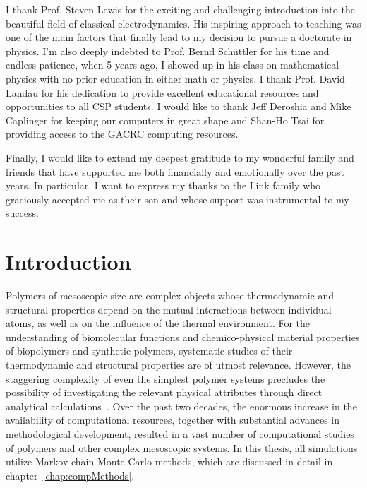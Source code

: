 \documentclass[12pt]{report}
\begin{document}
I thank Prof. Steven Lewis for the exciting and challenging introduction into the beautiful field of classical electrodynamics. His inspiring approach to teaching was one of the main factors that finally lead to my decision to pursue a doctorate in physics. I'm also deeply indebted to Prof. Bernd Sch\"{u}ttler for his time and endless patience, when 5 years ago, I showed up in his class on mathematical physics with no prior education in either math or physics. I thank Prof. David Landau for his dedication to provide excellent educational resources and opportunities to all CSP students. I would like to thank Jeff Deroshia and Mike Caplinger for keeping our computers in great shape and Shan-Ho Tsai for providing access to the GACRC computing resources.

Finally, I would like to extend my deepest gratitude to my wonderful family and friends that have supported me both financially and emotionally over the past years. In particular, I want to express my thanks to the Link family who graciously accepted me as their son and whose support was instrumental to my success.


\setcounter{tocdepth}{1}
\tableofcontents
{}
\listoffigures  %
\listoftables %


\chapter{Introduction}
\setcounter{page}{1}

%
Polymers of mesoscopic size are complex objects whose thermodynamic and structural properties depend on the mutual interactions between individual atoms, as well as on the influence of the thermal environment. For the understanding of biomolecular functions and chemico-physical material properties of biopolymers and synthetic polymers, systematic studies of their thermodynamic and structural properties are of utmost relevance. However, the staggering complexity of even the simplest polymer systems precludes the possibility of investigating the relevant physical attributes through direct analytical calculations~\cite{Bachmann2014}. Over the past two decades, the enormous increase in the availability of computational resources, together with substantial advances in methodological development, resulted in a vast number of computational studies of polymers and other complex mesoscopic systems. In this thesis, all simulations utilize Markov chain Monte Carlo methods, which are discussed in detail in chapter~\ref{chap:compMethods}. 
%
\end{document}
